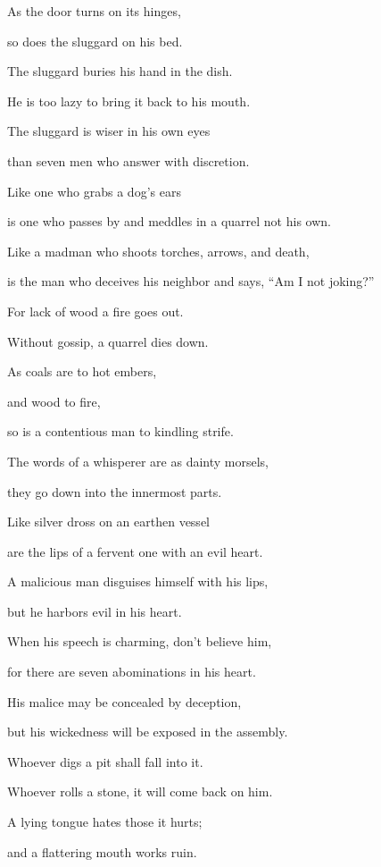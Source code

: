 {\par }{\Q {}As the door turns on its hinges,
\par }{\QB so does the sluggard on his bed.
\par }{\Q {}The sluggard buries his hand in the dish.
\par }{\QB He is too lazy to bring it back to his mouth.
\par }{\Q {}The sluggard is wiser in his own eyes
\par }{\QB than seven men who answer with discretion.
\par }{\Q {}Like one who grabs a dog’s ears
\par }{\QB is one who passes by and meddles in a quarrel not his own.
\par }{\Q {}Like a madman who shoots torches, arrows, and death,
\par }{\QB {}is the man who deceives his neighbor and says, “Am I not joking?”
\par }{\Q {}For lack of wood a fire goes out.
\par }{\QB Without gossip, a quarrel dies down.
\par }{\Q {}As coals are to hot embers,
\par }{\QB and wood to fire,
\par }{\QB so is a contentious man to kindling strife.
\par }{\Q {}The words of a whisperer are as dainty morsels,
\par }{\QB they go down into the innermost parts.
\par }{\Q {}Like silver dross on an earthen vessel
\par }{\QB are the lips of a fervent one with an evil heart.
\par }{\Q {}A malicious man disguises himself with his lips,
\par }{\QB but he harbors evil in his heart.
\par }{\Q {}When his speech is charming, don’t believe him,
\par }{\QB for there are seven abominations in his heart.
\par }{\Q {}His malice may be concealed by deception,
\par }{\QB but his wickedness will be exposed in the assembly.
\par }{\Q {}Whoever digs a pit shall fall into it.
\par }{\QB Whoever rolls a stone, it will come back on him.
\par }{\Q {}A lying tongue hates those it hurts;
\par }{\QB and a flattering mouth works ruin.

}
